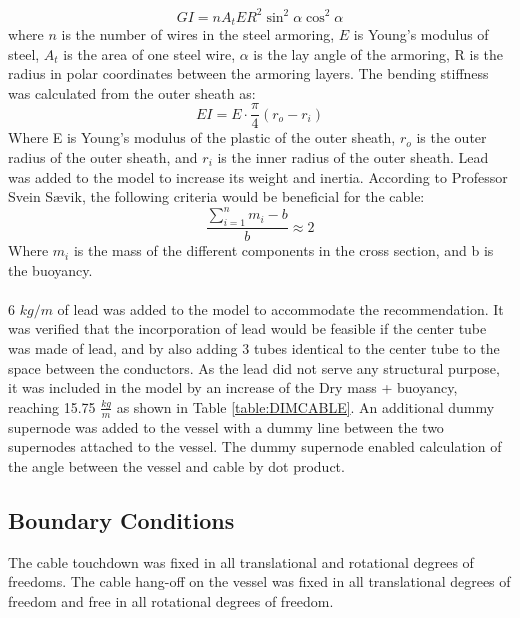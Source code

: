 \begin{equation}
    GI=nA_t E R^2 \sin^2 \alpha \cos^2 \alpha
\end{equation}
where $n$ is the number of wires in the steel armoring, $E$ is Young's modulus of steel, $A_t$ is the area of one steel wire, $\alpha$ is the lay angle of the armoring, R is the radius in polar coordinates between the armoring layers.  \newline
\newline 
The bending stiffness was calculated from the outer sheath as:
\begin{equation}
    EI= E\cdot \frac{\pi}{4}(r_o-r_i)
\end{equation}
Where E is Young's modulus of the plastic of the outer sheath, $r_o$ is the outer radius of the outer sheath, and $r_i$ is the inner radius of the outer sheath. \newline
\newline 
Lead was added to the model to increase its weight and inertia. According to Professor Svein Sævik, the following criteria would be beneficial for the cable:
\begin{equation}
    \frac{\sum_{i=1}^n m_i - b}{b}\approx 2
\end{equation}
Where $m_i$ is the mass of the different components in the cross section, and b is the buoyancy.\\\\ 6 $kg/m$ of lead was added to the model to accommodate the recommendation. It was verified that the incorporation of lead would be feasible if the center tube was made of lead, and by also adding 3 tubes identical to the center tube to the space between the conductors. As the lead did not serve any structural purpose, it was included in the model by an increase of the Dry mass + buoyancy, reaching 15.75 $\frac{kg}{m}$ as shown in Table \ref{table:DIMCABLE}. \newline
\newline An additional dummy supernode was added to the vessel with a dummy line between the two supernodes attached to the vessel. The dummy supernode enabled calculation of the angle between the vessel and cable by dot product. 

\subsection{Boundary Conditions}
The cable touchdown was fixed in all translational and rotational degrees of freedoms. The cable hang-off on the vessel was fixed in all translational degrees of freedom and free in all rotational degrees of freedom. 


